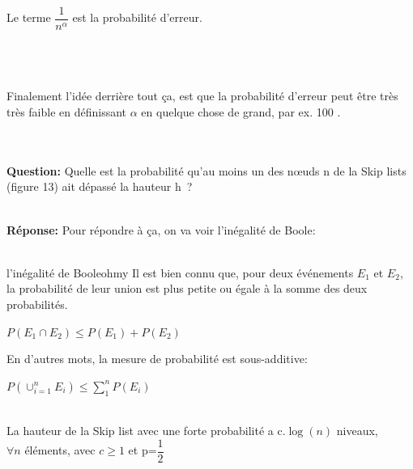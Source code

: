 \documentclass[hidelinks,a4paper,12pt]{article}
\begin{document}
~\\
Le terme $\dfrac{1}{n^\alpha}$ est la probabilité d'erreur. 

~\\~\\~\\
Finalement l'idée derrière tout ça, est que la probabilité d'erreur peut être très très faible en définissant $\alpha$ en quelque chose de grand, par ex. 100 \cite{ArticleDemaine}. 

~\\~\\
\textbf {Question:} Quelle est la probabilité qu'au moins un des nœuds n de la Skip lists (figure 13) ait dépassé la hauteur h ?

~\\
\textbf {Réponse:} Pour répondre à ça, on va voir l'inégalité de Boole:
~\\~\\


\begin{slantedtheorem}{l'inégalité de Boole}{ohmy}
	Il est bien connu que, pour deux événements $E_1$ et $E_2$, la probabilité de leur union est plus petite ou égale à la somme des deux probabilités.
	 \begin{center}
	 	$P(E_1 \cap E_2) \le P(E_1) + P(E_2) $
	 \end{center} 
	En d'autres mots, la mesure de probabilité est sous-additive:
	\begin{center}
		$P(\cup_{i=1}^n E_i) \le \sum_{1}^{n} P(E_i)  $ \cite{InegaliteDeBoole}
	\end{center} 
\end{slantedtheorem}

~\\ 
La hauteur de la Skip list avec une forte probabilité a c.$\log(n)$ niveaux,\\  $\forall n$ éléments,  avec $ c \ge 1$ et p=$\dfrac{1}{2}$ 
~\\
\end{document}

